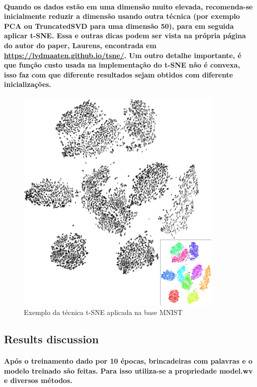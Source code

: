 \documentclass[a4paper]{article}    %
\begin{document}
\paragraph{Quando os dados estão em uma dimensão muito elevada, recomenda-se inicialmente reduzir a dimensão usando outra técnica (por exemplo PCA ou TruncatedSVD para uma dimensão 50), para em seguida aplicar t-SNE. Essa e outras dicas podem ser vista na própria página do autor do paper, Laurens, encontrada em \href{https://lvdmaaten.github.io/tsne/}{https://lvdmaaten.github.io/tsne/}. Um outro detalhe importante, é que função custo usada na implementação do t-SNE não é convexa, isso faz com que diferente resultados sejam obtidos com diferente inicializações.}

\begin{figure}[H]
    \centering
    \includegraphics[width=10cm]{t-sne_mnist}
    \caption{Exemplo da técnica t-SNE aplicada na base MNIST}
    \label{fig:tsne-mnist}
\end{figure}

\subsection{Results discussion}

\paragraph{Após o treinamento dado por 10 épocas, brincadeiras com palavras e o modelo treinado são feitas. Para isso utiliza-se a propriedade model.wv e diversos métodos.}
\end{document}
